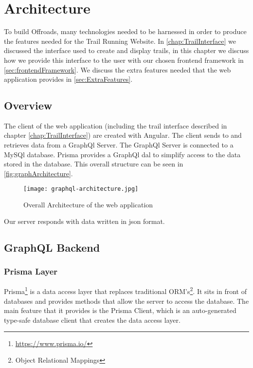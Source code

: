 \chapter{Architecture} \label{chap:Architecture}
To build Offroads, many technologies needed to be harnessed in order to produce the features needed for the Trail Running Website. In \autoref{chap:TrailInterface} we discussed the interface used to create and display trails, in this chapter we discuss how we provide this interface to the user with our chosen \Gls{frontend} framework in \autoref{sec:frontendFramework}. We discuss the extra features needed that the web application provides in \autoref{sec:ExtraFeatures}.

\section{Overview}
The client of the web application (including the trail interface described in chapter \ref{chap:TrailInterface}) are created with Angular. The client sends to and retrieves data from a GraphQl Server. The GraphQl Server is connected to a MySQl database. Prisma provides a GraphQl \acrfull{dal} to simplify access to the data stored in the database. This overall structure can be seen in \autoref{fig:graphArchitecture}.

\begin{figure}[ht]
    \centering
    \texttt{[image: graphql-architecture.jpg]}
    \caption{Overall Architecture of the web application}
    \label{fig:graphArchitecture}
\end{figure}

Our server responds with data written in \acrfull{json} format.

\section{GraphQL Backend}

\subsection{}

\subsection{Prisma Layer}
Prisma\footnote{\url{https://www.prisma.io/}} is a data access layer that replaces traditional ORM's\footnote{Object Relational Mappings}. It sits in front of databases and provides methods that allow the server to access the database. The main feature that it provides is the Prisma Client, which is an auto-generated type-safe database client that creates the data access layer.

